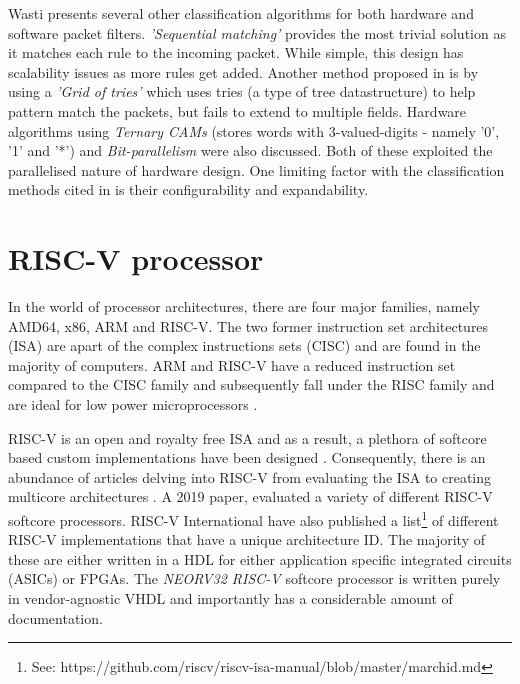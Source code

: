\newpage

Wasti \cite{Wasti2001HardwareAP} presents several other classification algorithms for both hardware and software packet filters. \textit{'Sequential matching'} provides the most 
trivial solution as it matches each rule to the incoming packet. While simple, this design has scalability issues as more rules get added. Another method proposed in 
\cite{Wasti2001HardwareAP} is by using a \textit{'Grid of tries'} which uses tries (a type of tree datastructure) to help pattern match the packets, but fails to extend to multiple fields. 
Hardware algorithms using \textit{Ternary CAMs} (stores words with 3-valued-digits - namely '0', '1' and '*') and \textit{Bit-parallelism} were also discussed. Both of these 
exploited the parallelised nature of hardware design. One limiting factor with the classification methods cited in \cite{Wasti2001HardwareAP} is their configurability and 
expandability. 



\section{RISC-V processor}
In the world of processor architectures, there are four major families, namely AMD64, x86, ARM and RISC-V. The two former instruction set architectures (ISA) 
are apart of the complex instructions sets (CISC) and are found in the majority of computers. ARM and RISC-V have a reduced instruction set compared to the CISC family and 
subsequently fall under the RISC family and are ideal for low power microprocessors \cite{RV16Embedded}.

RISC-V is an open and royalty free ISA and as a result, a plethora of softcore based custom implementations have been designed \cite{CatalogRISCSoftcore}. 
Consequently, there is an abundance of articles delving into RISC-V from evaluating the ISA \cite{InvestigatingRiscv} to creating multicore architectures
\cite{RiscVMulticore}. A 2019 paper, \cite{CatalogRISCSoftcore} evaluated a variety of different RISC-V softcore processors. RISC-V International have 
also published a list\footnote[1]{See: https://github.com/riscv/riscv-isa-manual/blob/master/marchid.md} of different RISC-V implementations 
that have a unique architecture ID. The majority of these are either written in a HDL for either application specific integrated circuits (ASICs) or FPGAs.
The \textit{NEORV32 RISC-V} softcore processor is written purely in vendor-agnostic VHDL and importantly has a considerable amount of documentation. 

